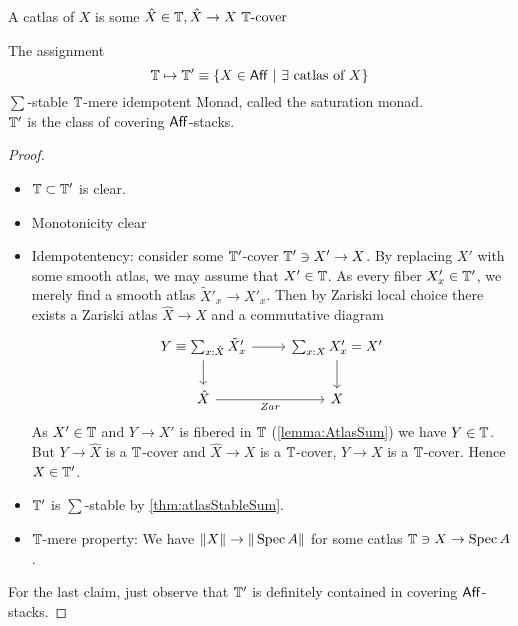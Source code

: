 \begin{definition}
	A catlas of $X$ is  some $\hat X \in \mathbb{T} , \hat X \to X \text{ $\mathbb{T}$-cover }$
\end{definition}
\begin{prop}
	The assignment
		\[
		\mathbb{T} \mapsto \mathbb{T}' \equiv \{X \in \mathsf{Aff} \ | \  \exists \text{ catlas of } X \}
		\]
	$\sum$-stable $\mathbb{T}$-mere idempotent Monad, called the saturation monad. \\
	 $\mathbb{T}'$ is the class of covering $\mathsf{Aff}$-stacks.
\end{prop}
\begin{proof}
	\begin{itemize}
		\item $\mathbb{T} \subset \mathbb{T}'$ is clear.
		\item Monotonicity clear
		\item Idempotentency:  consider some $\mathbb{T}'$-cover $\mathbb{T}' \ni X' \to X$. By replacing $X'$ with some smooth atlas, we may assume that $X' \in \mathbb{T}$. As every fiber $X'_x \in \mathbb{T}'$, we merely find a smooth atlas $\tilde X'_x \to X'_x$. Then by Zariski local choice there exists a Zariski atlas $\hat X \to X$ and a commutative diagram 
	\[\begin{tikzcd}
		Y \equiv {\sum_{x : \hat X}\tilde X'_x} & {\sum_{x : X}X'_x} = X' \\
		{\hat X} & X
		\arrow[from=1-1, to=1-2]
		\arrow[from=1-1, to=2-1]
		\arrow[from=1-2, to=2-2]
		\arrow["Zar"', from=2-1, to=2-2]
	\end{tikzcd}\]
	As $X' \in \mathbb{T}$ and $Y \to X'$ is fibered in $\mathbb{T}$ (\ref{lemma:AtlasSum}) we have $Y \in \mathbb{T}$. But $Y \to \hat X$ is a $\mathbb{T}$-cover and $\hat X \to X$ is a $\mathbb{T}$-cover, $Y \to X$ is a $\mathbb{T}$-cover. Hence $X \in \mathbb{T}'$.
		\item 	$\mathbb{T}'$ is $\sum$-stable by \ref{thm:atlasStableSum}. \\
		\item $\mathbb{T}$-mere property: We have $\|X\| \to \|\operatorname{Spec} A\|$ for some catlas $\mathbb{T} \ni X \to \operatorname{Spec} A$.
		\end{itemize}
		For the last claim, just observe that $\mathbb{T}'$ is definitely contained in covering $\mathsf{Aff}$-stacks.
\end{proof}

